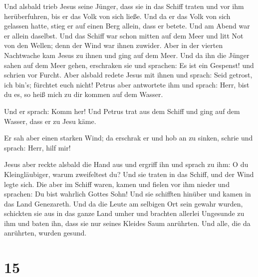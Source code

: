  Und alsbald trieb Jesus seine Jünger, dass sie in das
Schiff traten und vor ihm herüberfuhren, bis er das Volk von sich ließe.
 Und da er das Volk von sich gelassen hatte, stieg er auf
einen Berg allein, dass er betete. Und am Abend war er allein daselbst.
 Und das Schiff war schon mitten auf dem Meer und litt
Not von den Wellen; denn der Wind war ihnen zuwider. 
Aber in der vierten Nachtwache kam Jesus zu ihnen und ging auf dem Meer.
 Und da ihn die Jünger sahen auf dem Meer gehen,
erschraken sie und sprachen: Es ist ein Gespenst! und schrien vor
Furcht.  Aber alsbald redete Jesus mit ihnen und sprach:
Seid getrost, ich bin's; fürchtet euch nicht!  Petrus
aber antwortete ihm und sprach: Herr, bist du es, so heiß mich zu dir
kommen auf dem Wasser.

 Und er sprach: Komm her! Und Petrus trat aus dem Schiff
und ging auf dem Wasser, dass er zu Jesu käme.

 Er sah aber einen starken Wind; da erschrak er und hob
an zu sinken, schrie und sprach: Herr, hilf mir!

 Jesus aber reckte alsbald die Hand aus und ergriff ihn
und sprach zu ihm: O du Kleingläubiger, warum zweifeltest du?
 Und sie traten in das Schiff, und der Wind legte sich.
 Die aber im Schiff waren, kamen und fielen vor ihm
nieder und sprachen: Du bist wahrlich Gottes Sohn!  Und
sie schifften hinüber und kamen in das Land Genezareth. 
Und da die Leute am selbigen Ort sein gewahr wurden, schickten sie aus
in das ganze Land umher und brachten allerlei Ungesunde zu ihm
 und baten ihn, dass sie nur seines Kleides Saum
anrührten. Und alle, die da anrührten, wurden gesund.

\hypertarget{section-14}{%
\section{15}\label{section-14}}

